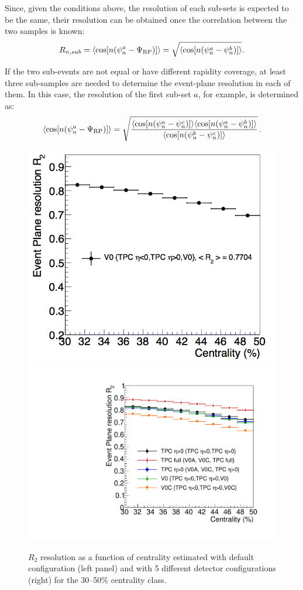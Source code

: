 Since, given the conditions above, the resolution of each sub-sets is expected 
to be the same, their resolution can be obtained 
once the correlation between the two samples is known:
\begin{equation}
R_{n, sub} = \langle {\rm cos} [n({\rm \psi}^a_n-{\rm \Psi}_{\rm RP})] \rangle = \sqrt{\langle {\rm cos} [n({\rm \psi}^a_n-{\rm \psi}^b_n)] \rangle}.
\end{equation}

If the two sub-events are not equal or have different rapidity coverage,
at least three sub-samples are needed to determine the 
event-plane resolution in each of them. In this case, 
the resolution of the first sub-set $a$, for example, is determined as:
\begin{equation}
 \langle {\rm cos} [n({\rm \psi}^a_n-{\rm \Psi}_{\rm RP})] \rangle = 
\sqrt{\frac{\langle\cos [n(\psi_n^a-\psi_n^c)] \rangle \langle\cos [n(\psi_n^a-\psi_n^b)] \rangle}{\langle\cos [n(\psi_n^b-\psi_n^c)] \rangle}}\, .
\end{equation}

\begin{figure}
\centering
  \includegraphics[width=.49\textwidth]{FigCap5/resoEP3050.png}
  \includegraphics[width=.49\textwidth]{FigCap5/EPresolution_comparison.pdf}
\caption{$R_2$ resolution as a function of centrality estimated with default configuration (left panel) and with 5 different detector configurations (right) for the 30--50\% centrality class.}
\label{fig:resoVsDetConfig}
\end{figure}

